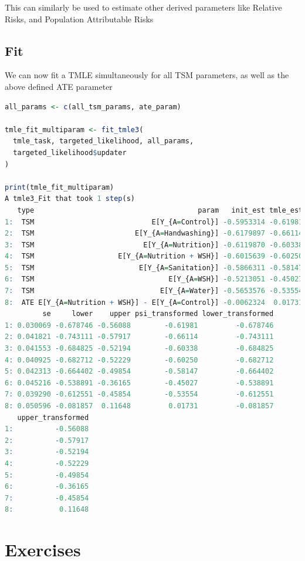 \documentclass[
  12pt, krantz2,
]{book}
\theoremstyle{definition}
\theoremstyle{definition}
\theoremstyle{definition}
\newcommand{\1}{\mathbbm{1}}
\begin{document}
This can similarly be used to estimate other derived parameters like Relative
Risks, and Population Attributable Risks

\hypertarget{fit}{%
\subsection{Fit}\label{fit}}

We can now fit a TMLE simultaneously for all TSM parameters, as well as the
above defined ATE parameter

\begin{lstlisting}[language=R]
all_params <- c(all_tsm_params, ate_param)

tmle_fit_multiparam <- fit_tmle3(
  tmle_task, targeted_likelihood, all_params,
  targeted_likelihood$updater
)

print(tmle_fit_multiparam)
A tmle3_Fit that took 1 step(s)
   type                                       param   init_est tmle_est
1:  TSM                            E[Y_{A=Control}] -0.5953314 -0.61981
2:  TSM                        E[Y_{A=Handwashing}] -0.6179897 -0.66114
3:  TSM                          E[Y_{A=Nutrition}] -0.6119870 -0.60338
4:  TSM                    E[Y_{A=Nutrition + WSH}] -0.6015639 -0.60250
5:  TSM                         E[Y_{A=Sanitation}] -0.5866311 -0.58147
6:  TSM                                E[Y_{A=WSH}] -0.5213051 -0.45027
7:  TSM                              E[Y_{A=Water}] -0.5653576 -0.53554
8:  ATE E[Y_{A=Nutrition + WSH}] - E[Y_{A=Control}] -0.0062324  0.01731
         se     lower    upper psi_transformed lower_transformed
1: 0.030069 -0.678746 -0.56088        -0.61981         -0.678746
2: 0.041821 -0.743111 -0.57917        -0.66114         -0.743111
3: 0.041553 -0.684825 -0.52194        -0.60338         -0.684825
4: 0.040925 -0.682712 -0.52229        -0.60250         -0.682712
5: 0.042313 -0.664402 -0.49854        -0.58147         -0.664402
6: 0.045216 -0.538891 -0.36165        -0.45027         -0.538891
7: 0.039290 -0.612551 -0.45854        -0.53554         -0.612551
8: 0.050596 -0.081857  0.11648         0.01731         -0.081857
   upper_transformed
1:          -0.56088
2:          -0.57917
3:          -0.52194
4:          -0.52229
5:          -0.49854
6:          -0.36165
7:          -0.45854
8:           0.11648
\end{lstlisting}

\hypertarget{exercises}{%
\section{Exercises}\label{exercises}}
\end{document}
